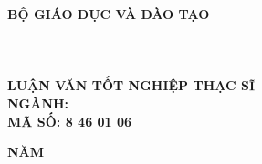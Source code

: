 \begin{titlepage}

\begin{center}

{\fontsize{14}{0pt}\selectfont\bfseries BỘ GIÁO DỤC VÀ ĐÀO TẠO}\\
\textbf{\fontsize{14}{0pt}\selectfont\university}\\[3cm]

\textbf{\fontsize{14}{0pt}\selectfont\MakeUppercase\student}\\[3cm]

\textbf{{\fontsize{20}{0pt}\selectfont\MakeUppercase \nametitle}}
\\[4cm]

\textbf{\fontsize{16}{0pt}\selectfont LUẬN VĂN TỐT NGHIỆP THẠC SĨ}\\[1em]
\textbf{\fontsize{14}{0pt}\selectfont NGÀNH: \MakeUppercase \major}\\
\textbf{\fontsize{14}{0pt}\selectfont MÃ SỐ: 8 46 01 06}



\vfill
\textbf{\fontsize{14}{0pt}\selectfont NĂM \yeardone}

\end{center}

\end{titlepage}